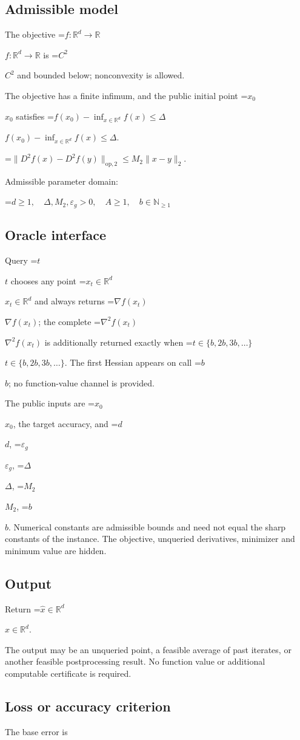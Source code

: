 \documentclass[10pt,a4paper]{article}
\newcommand{\AtlasMath}[1]{\par\begingroup\centering\setbox0=\hbox{$\displaystyle #1$}\ifdim\wd0>1.4\linewidth\typeout{ATLAS WIDE FORMULA: \the\wd0}\fi\ifdim\wd0>\linewidth\resizebox{\linewidth}{!}{\box0}\else\box0\fi\par\endgroup}
\newcommand{\AtlasInlineMath}[1]{\begingroup\setbox0=\hbox{$#1$}\ifdim\wd0>.4\linewidth\endgroup\AtlasMath{#1}\else\endgroup$#1$\fi}
\begin{document}
\subsection{Admissible model}
The objective \AtlasInlineMath{f:\mathbb{R}^d\to\mathbb{R}} is \AtlasInlineMath{C^2} and bounded below; nonconvexity is allowed.

The objective has a finite infimum, and the public initial point \AtlasInlineMath{x_0} satisfies \AtlasInlineMath{f(x_0)-\inf_{x\in \mathbb{R}^d}f(x)\le\Delta}.


\AtlasMath{\|D^{2}f(x)-D^{2}f(y)\|_{\mathrm{op},2}\le M_2\|x-y\|_{2}.}


Admissible parameter domain:


\AtlasMath{d\ge1,\quad\Delta,M_2,\varepsilon_g>0,\quad A\ge1,\quad b\in\mathbb{N}_{\ge1}}


\subsection{Oracle interface}
Query \AtlasInlineMath{t} chooses any point \AtlasInlineMath{x_t\in\mathbb{R}^d} and always returns \AtlasInlineMath{\nabla f(x_t)}; the complete \AtlasInlineMath{\nabla^2f(x_t)} is additionally returned exactly when \AtlasInlineMath{t\in\{b,2b,3b,\ldots\}}. The first Hessian appears on call \AtlasInlineMath{b}; no function-value channel is provided.

The public inputs are \AtlasInlineMath{x_0}, the target accuracy, and \AtlasInlineMath{d}, \AtlasInlineMath{\varepsilon_g}, \AtlasInlineMath{\Delta}, \AtlasInlineMath{M_2}, \AtlasInlineMath{b}. Numerical constants are admissible bounds and need not equal the sharp constants of the instance. The objective, unqueried derivatives, minimizer and minimum value are hidden.

\subsection{Output}
Return \AtlasInlineMath{\widehat{x}\in \mathbb{R}^d}.

The output may be an unqueried point, a feasible average of past iterates, or another feasible postprocessing result. No function value or additional computable certificate is required.

\subsection{Loss or accuracy criterion}
The base error is
\end{document}
